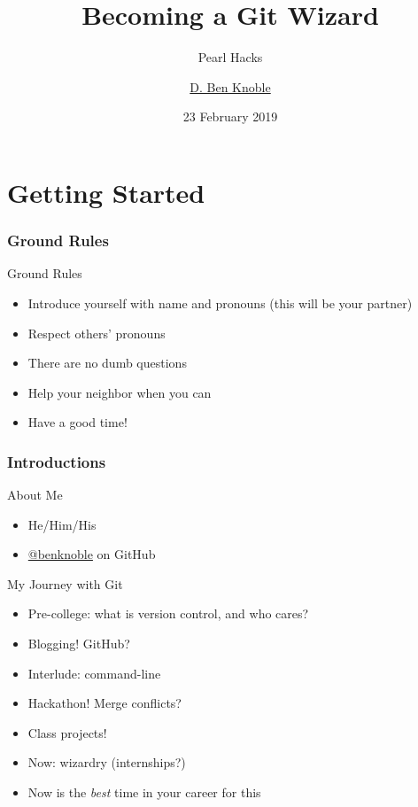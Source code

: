 \documentclass{beamer}
\title{Becoming a Git Wizard}
\subtitle{Pearl Hacks}
\author{\href{https://benknoble.github.io}{D. Ben Knoble}}
\institute{UNC Chapel Hill}
\date{23 February 2019}
\theoremstyle{example}
\begin{document}

\frame[label=title]{\titlepage}

\part{Getting Started}
\frame{\partpage}
\frame{\tableofcontents[part=1]}

\section{Ground Rules}
\begin{frame}{Ground Rules}
    \begin{itemize}
        \item Introduce yourself with name and pronouns (this will be your
            partner)
        \item Respect others' pronouns
        \item There are no dumb questions
        \item Help your neighbor when you can
        \item Have a good time!
    \end{itemize}
\end{frame}

\section{Introductions}
\begin{frame}{About Me}
    \begin{itemize}
        \item He/Him/His
        \item \href{https://github.com/benknoble}{@benknoble} on GitHub
    \end{itemize}
\end{frame}

\begin{frame}{My Journey with Git}
    \begin{itemize}[<+->]
        \item Pre-college: what is version control, and who cares?
        \item Blogging! GitHub?
        \item Interlude: command-line
        \item Hackathon! Merge conflicts?
        \item Class projects!
        \item Now: wizardry (internships?)
        \item Now is the \emph{best} time in your career for this
    \end{itemize}
\end{frame}
\end{document}
